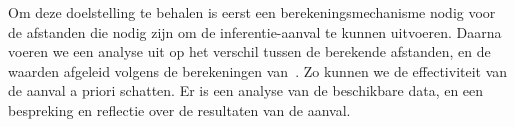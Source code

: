Om deze doelstelling te behalen is eerst een berekeningsmechanisme nodig voor
de afstanden die nodig zijn om de inferentie-aanval te kunnen uitvoeren. Daarna
voeren we een analyse uit op het verschil tussen de berekende afstanden, en de
waarden afgeleid volgens de berekeningen
van~\citeauthor{Dhondt}. Zo kunnen we
de effectiviteit van de aanval a priori schatten. Er is een analyse van de
beschikbare data, en een bespreking en reflectie over de resultaten van de
aanval.